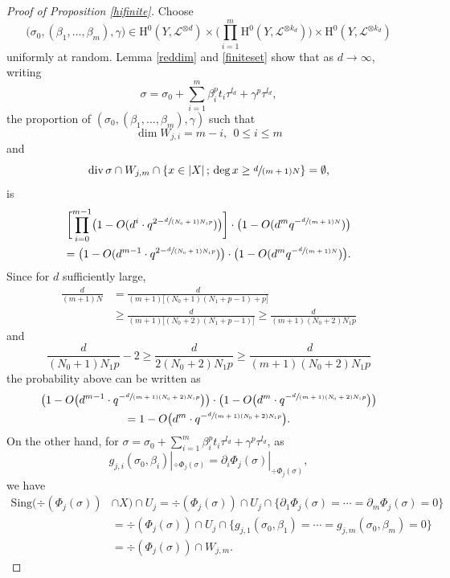 \documentclass[11pt]{article}
\numberwithin{equation}{section}
\newcommand{\sep}{\,;\,}
\theoremstyle{plain}
\theoremstyle{definition}
\newcommand{\ho}{\mathrm{H}}
\begin{document}
\begin{proof}[Proof of Proposition \ref{hifinite}]
Choose
\[
\bigl(\sigma_0, (\beta_1,\dots, \beta_m), \gamma\bigr)\in \ho^0(Y,\mathcal{L}^{\otimes d})\times \biggl(\prod_{i=1}^m \ho^0(Y,\mathcal{L}^{\otimes k_d}) \biggr) \times \ho^0(Y, \mathcal{L}^{\otimes k_d})
\]
uniformly at random. Lemma \ref{reddim} and \ref{finiteset} show that as $d\to \infty$, writing
\[
\sigma=\sigma_0+\sum_{i=1}^{m} \beta_i^pt_i\tau^{l_d}+\gamma^p\tau^{l_d},
\]
the proportion of $(\sigma_0, (\beta_1,\dots, \beta_m), \gamma)$ such that
\[
\dim W_{j,i}=m-i,\ \ 0\leq i\leq m
\]
and
\[
\div \sigma\cap W_{j,m}\cap \left\{ x\in |X|\sep \deg x\geq\sfrac{d}{(m+1)N} \right\}=\emptyset,
\]
is
\begin{multline*}
\biggl[ \prod_{i=0}^{m-1}\bigl(1-O(d^i\cdot q^{2-\sfrac{d}{(N_0+1)N_1p}})\bigr) \biggr]\cdot \bigl(1-O(d^m q^{-\sfrac{d}{(m+1)N}}) \bigr) \\
=\bigl(1-O(d^{m-1}\cdot q^{2-\sfrac{d}{(N_0+1)N_1p}})\bigr)\cdot \bigl(1-O(d^m q^{-\sfrac{d}{(m+1)N}}) \bigr).
\end{multline*}
Since for $d$ sufficiently large,
\begin{align*}
\frac{d}{(m+1)N}&= \frac{d}{(m+1)\big[(N_0+1)(N_1+p-1)+p\big]}\\
&\geq \frac{d}{(m+1)\big[(N_0+2)(N_1+p-1)\big]}\geq \frac{d}{(m+1)(N_0+2)N_1 p}
\end{align*}
and
\[
\frac{d}{(N_0+1)N_1p}-2\geq \frac{d}{2(N_0+2)N_1 p}\geq \frac{d}{(m+1)(N_0+2)N_1 p}
\]
the probability above can be written as
\begin{multline*}
\bigl(1-O\bigl(d^{m-1}\cdot q^{-\sfrac{d}{(m+1)(N_0+2)N_1 p}}\bigr)\bigr)\cdot \bigl(1-O\bigl(d^{m}\cdot q^{-\sfrac{d}{(m+1)(N_0+2)N_1 p}}\bigr)\bigr)\\
=1-O\bigl(d^{m}\cdot q^{-\sfrac{d}{(m+1)(N_0+2)N_1 p}}\bigr).
\end{multline*}
On the other hand, for $\sigma=\sigma_0+\sum_{i=1}^{m} \beta_i^pt_i\tau^{l_d}+\gamma^p\tau^{l_d}$, as
\[
g_{j,i}(\sigma_0,\beta_i)|_{ \div \Phi_{j}(\sigma)}=\partial_i\Phi_{j}(\sigma)|_{ \div \Phi_{j}(\sigma)},
\]
we have
\begin{align*}
\mathrm{Sing}(\div (\Phi_j(\sigma))&\cap X)\cap U_j
= \div (\Phi_j(\sigma))\cap U_j\cap \{ \partial_1\Phi_j(\sigma)=\cdots=\partial_m\Phi_j(\sigma)=0 \}\\
&=\div (\Phi_j(\sigma))\cap U_j\cap \{ g_{j,1}(\sigma_0,\beta_1)=\cdots=g_{j,m}(\sigma_0,\beta_m)=0\} \\
&= \div (\Phi_j(\sigma))\cap W_{j,m}.

\end{align*}
\end{proof}
\end{document}

